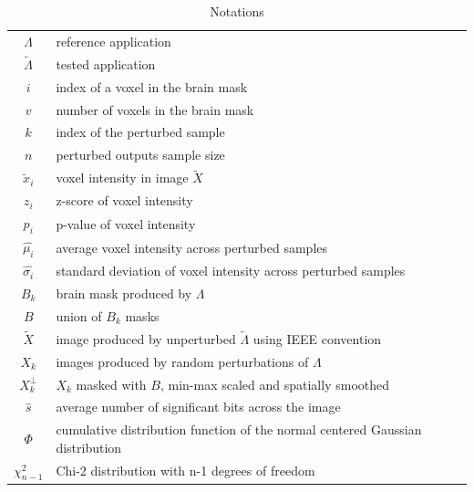 \documentclass{article}
\begin{document}
\begin{table}
    \centering
    \begin{tabular}{c|l}
        $\Lambda$        & reference application                                                         \\
        $\tilde \Lambda$ & tested application                                                            \\
        $i$              & index of a voxel in the brain mask                                            \\
        $v$              & number of voxels in the brain mask                                            \\
        $k$              & index of the perturbed sample                                                 \\
        $n$              & perturbed outputs sample size                                                 \\
        $\tilde x_i$     & voxel intensity in image $\tilde X$                                           \\
        $z_i$            & z-score of voxel intensity                                                    \\
        $p_i$            & p-value of voxel intensity                                                    \\
        $\hat{\mu_i}$    & average voxel intensity across perturbed samples                              \\
        $\hat{\sigma_i}$ & standard deviation of voxel intensity across perturbed samples                \\
        $B_k$            & brain mask produced by $\Lambda$                                              \\
        $B$              & union of $B_k$ masks                                                          \\
        $\tilde X$       & image produced by unperturbed $\tilde \Lambda$ using IEEE convention          \\
        $X_k$            & images produced by random perturbations of $\Lambda$                          \\
        $X_k^{\perp}$    & $X_k$ masked with $B$, min-max scaled and spatially smoothed                  \\
        $\hat{s}$        & average number of significant bits across the image                           \\
        $\Phi$           & cumulative distribution function of the normal centered Gaussian distribution \\
        $\chi^2_{n-1}$   & Chi-2 distribution with n-1 degrees of freedom                                \\
    \end{tabular}
    \caption{Notations}
    \label{tab:notations}
\end{table}
\end{document}
